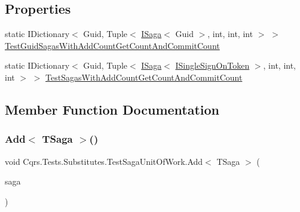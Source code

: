 \subsection*{Properties}
\begin{DoxyCompactItemize}
\item 
static I\+Dictionary$<$ Guid, Tuple$<$ \hyperlink{interfaceCqrs_1_1Domain_1_1ISaga}{I\+Saga}$<$ Guid $>$, int, int, int $>$ $>$ \hyperlink{classCqrs_1_1Tests_1_1Substitutes_1_1TestSagaUnitOfWork_ac917d6c520ef42fb92a56a7505b98302}{Test\+Guid\+Sagas\+With\+Add\+Count\+Get\+Count\+And\+Commit\+Count}
\item 
static I\+Dictionary$<$ Guid, Tuple$<$ \hyperlink{interfaceCqrs_1_1Domain_1_1ISaga}{I\+Saga}$<$ \hyperlink{interfaceCqrs_1_1Authentication_1_1ISingleSignOnToken}{I\+Single\+Sign\+On\+Token} $>$, int, int, int $>$ $>$ \hyperlink{classCqrs_1_1Tests_1_1Substitutes_1_1TestSagaUnitOfWork_a159f0f56913792373a9270e888caaa97}{Test\+Sagas\+With\+Add\+Count\+Get\+Count\+And\+Commit\+Count}
\end{DoxyCompactItemize}


\subsection{Member Function Documentation}
\mbox{\label{classCqrs_1_1Tests_1_1Substitutes_1_1TestSagaUnitOfWork_a9469938dc87569d5fa29aea5c97e610f}} 
\subsubsection{\texorpdfstring{Add$<$ T\+Saga $>$()}{Add< TSaga >()}}
{\footnotesize\ttfamily void Cqrs.\+Tests.\+Substitutes.\+Test\+Saga\+Unit\+Of\+Work.\+Add$<$ T\+Saga $>$ (\begin{DoxyParamCaption}\item[{T\+Saga}]{saga }\end{DoxyParamCaption})}



